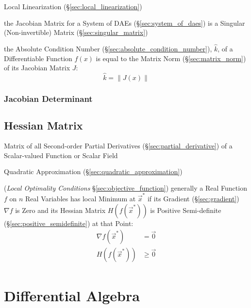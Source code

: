 \fist Local Linearization (\S\ref{sec:local_linearization})

\fist the Jacobian Matrix for a System of DAEs (\S\ref{sec:system_of_daes}) is
a Singular (Non-invertible) Matrix (\S\ref{sec:singular_matrix})

the Absolute Condition Number (\S\ref{sec:absolute_condition_number}),
$\hat{k}$, of a Differentiable Function $f(x)$ is equal to the Matrix Norm
(\S\ref{sec:matrix_norm}) of its Jacobian Matrix $J$:
\[
  \hat{k} = \|J(x)\|
\]



\subsubsection{Jacobian Determinant}\label{sec:jacobian_determinant}



\subsection{Hessian Matrix}\label{sec:hessian_matrix}


Matrix of all Second-order Partial Derivatives (\S\ref{sec:partial_derivative})
of a Scalar-valued Function or Scalar Field

\fist Quadratic Approximation (\S\ref{sec:quadratic_approximation})

(\emph{Local Optimality Conditions} \S\ref{sec:objective_function}) generally a
Real Function $f$ on $n$ Real Variables has local Minimum at $\vec{x}^*$ if its
Gradient (\S\ref{sec:gradient}) $\nabla f$ is Zero and its Hessian Matrix
$H(f(\vec{x}^*))$ is Positive Semi-definite (\S\ref{sec:positive_semidefinite})
at that Point:
\begin{align*}
  \nabla f(\vec{x}^*) & = \vec{0}    \\
  H(f(\vec{x}^*))     & \geq \vec{0} \\
\end{align*}



\section{Differential Algebra}\label{sec:differential_algebra}

